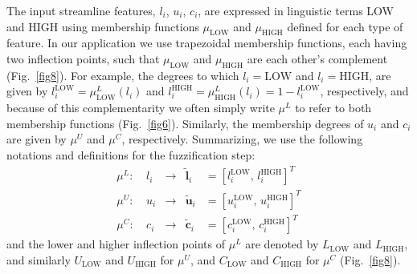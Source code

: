 The input streamline features, $l_{i}$, $u_{i}$, $c_{i}$, are expressed in linguistic terms LOW and HIGH using membership functions $\mu_{\textrm{LOW}}$ and $\mu_{\textrm{HIGH}}$ defined for each type of feature. In our application we use trapezoidal membership functions, each having two inflection points, such that $\mu_{\textrm{LOW}}$ and $\mu_{\textrm{HIGH}}$ are each other's complement (Fig.~\ref{fig8}). For example, the degrees to which $l_{i}=\textrm{LOW}$ and $l_{i}=\textrm{HIGH}$, are given by $l_{i}^{\textrm{LOW}}=\mu^{L}_{\textrm{LOW}}(l_{i})$ and $l_{i}^{\textrm{HIGH}}=\mu^{L}_{\textrm{HIGH}}(l_{i})=1-l_{i}^{\textrm{LOW}}$, respectively, and because of this complementarity we often simply write $\mu^{L}$ to refer to both membership functions (Fig.~\ref{fig6}). Similarly, the membership degrees of $u_{i}$ and $c_{i}$ are given by $\mu^{U}$ and $\mu^{C}$, respectively. Summarizing, we use the following notations and definitions for the fuzzification step:
\begin{equation}
\begin{array}{lcccl}
\mu^{L}\!:\ & l_{i} & \rightarrow & \tilde{\mathbf{l}}_{i} & = \left[l_{i}^{\textrm{LOW}}\!,\, l_{i}^{\textrm{HIGH}}\right]^T \\[1ex]
\mu^{U}\!:\ & u_{i} & \rightarrow & \tilde{\mathbf{u}}_{i} & = \left[u_{i}^{\textrm{LOW}}\!,\, u_{i}^{\textrm{HIGH}}\right]^T \\[1ex]
\mu^{C}\!:\ & c_{i} & \rightarrow & \tilde{\mathbf{c}}_{i} & = \left[c_{i}^{\textrm{LOW}}\!,\, c_{i}^{\textrm{HIGH}}\right]^T
\end{array}
\end{equation}
and the lower and higher inflection points of $\mu^{L}$ are denoted by $L_{\textrm{LOW}}$ and $L_{\textrm{HIGH}}$, and similarly $U_{\textrm{LOW}}$ and $U_{\textrm{HIGH}}$ for $\mu^{U}$, and $C_{\textrm{LOW}}$ and $C_{\textrm{HIGH}}$ for $\mu^{C}$ (Fig.~\ref{fig8}).


